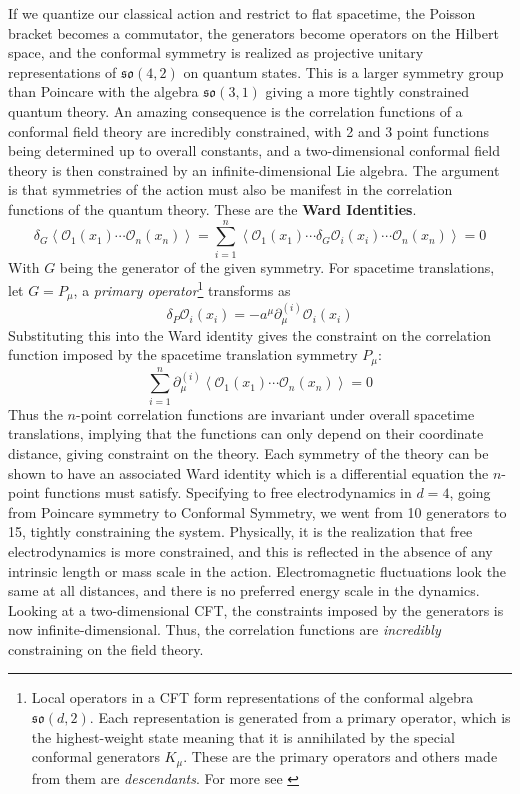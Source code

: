 \documentclass{article}
\begin{document}
If we quantize our classical action and restrict to flat spacetime, the Poisson bracket becomes a commutator, the generators become operators on the Hilbert space, and the conformal symmetry is realized as projective unitary representations of $\mathfrak{so}(4,2)$ on quantum states. This is a larger symmetry group than Poincare with the algebra $\mathfrak{so}(3,1)$ giving a more tightly constrained quantum theory. An amazing consequence is the correlation functions of a conformal field theory are incredibly constrained, with 2 and 3 point functions being determined up to overall constants, and a two-dimensional conformal field theory is then constrained by an infinite-dimensional Lie algebra. The argument is that symmetries of the action must also be manifest in the correlation functions of the quantum theory. These are the \textbf{Ward Identities}.
\begin{equation}
    \delta_G
    \left\langle
    \mathcal{O}_1(x_1)\cdots \mathcal{O}_n(x_n)
    \right\rangle
    =
    \sum_{i=1}^{n}
    \left\langle
    \mathcal{O}_1(x_1)\cdots
    \delta_G \mathcal{O}_i(x_i)
    \cdots \mathcal{O}_n(x_n)
    \right\rangle
    =0
\end{equation}
With $G$ being the generator of the given symmetry. For spacetime translations, let \(G = P_\mu\), a \textit{primary operator}\footnote{Local operators in a CFT form representations of the conformal algebra $\mathfrak{so}(d,2)$. Each representation is generated from a primary operator, which is the highest-weight state meaning that it is annihilated by the special conformal generators $K_\mu$. These are the primary operators and others made from them are \textit{descendants}. For more see \cite{difrancesco1997}} transforms as
\begin{equation}
    \delta_P \mathcal{O}_i(x_i)
    =
    -a^\mu \partial_\mu^{(i)} \mathcal{O}_i(x_i)
\end{equation}
Substituting this into the Ward identity gives the constraint on the correlation function imposed by the spacetime translation symmetry $P_\mu$:
\begin{equation}
    \sum_{i=1}^{n}
    \partial_\mu^{(i)}
    \left\langle
    \mathcal{O}_1(x_1)\cdots \mathcal{O}_n(x_n)
    \right\rangle
    =0
\end{equation}
Thus the \(n\)-point correlation functions are invariant under overall spacetime translations, implying that the functions can only depend on their coordinate distance, giving constraint on the theory. 
Each symmetry of the theory can be shown to have an associated Ward identity which is a differential equation the \(n\)-point functions must satisfy. Specifying to free electrodynamics in $d = 4$, going from Poincare symmetry to Conformal Symmetry, we went from 10 generators to 15, tightly constraining the system. Physically, it is the realization that free electrodynamics is more constrained, and this is reflected in the absence of any intrinsic length or mass scale in the  action. Electromagnetic fluctuations look the same at all distances, and there is no preferred energy scale in the dynamics. Looking at a two-dimensional CFT, the constraints imposed by the generators is now infinite-dimensional. Thus, the correlation functions are \textit{incredibly} constraining on the field theory. 
\end{document}
